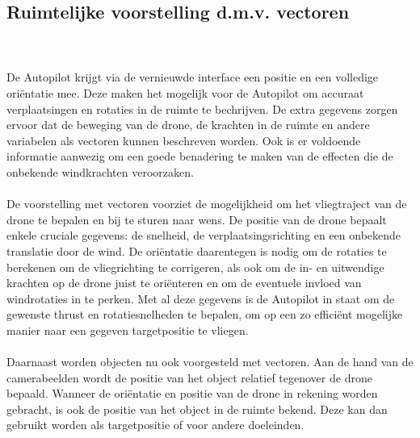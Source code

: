 \subsection{Ruimtelijke voorstelling d.m.v. vectoren}
\\
\\
De Autopilot krijgt via de vernieuwde interface een positie en een volledige ori\"entatie mee. Deze maken het mogelijk voor de Autopilot om accuraat verplaatsingen en rotaties in de ruimte te bechrijven. De extra gegevens zorgen ervoor dat de beweging van de drone, de krachten in de ruimte en andere variabelen als vectoren kunnen beschreven worden. Ook is er voldoende informatie aanwezig om een goede benadering te maken van de effecten die de onbekende windkrachten veroorzaken.
\\
\\
De voorstelling met vectoren voorziet de mogelijkheid om het vliegtraject van de drone te bepalen en bij te sturen naar wens. De positie van de drone bepaalt enkele cruciale gegevens: de snelheid, de verplaatsingsrichting en een onbekende translatie door de wind. De ori\"entatie daarentegen is nodig om de rotaties te berekenen om de vliegrichting te corrigeren, als ook om de in- en uitwendige krachten op de drone juist te ori\"enteren en om de eventuele invloed van windrotaties in te perken. Met al deze gegevens is de Autopilot in staat om de gewenste thrust en rotatiesnelheden te bepalen, om op een zo effici\"ent mogelijke manier naar een gegeven targetpositie te vliegen.
\\
\\
Daarnaast worden objecten nu ook voorgesteld met vectoren. Aan de hand van de camerabeelden wordt de positie van het object relatief tegenover de drone bepaald. Wanneer de ori\"entatie en positie van de drone in rekening worden gebracht, is ook de positie van het object in de ruimte bekend. Deze kan dan gebruikt worden als targetpositie of voor andere doeleinden.